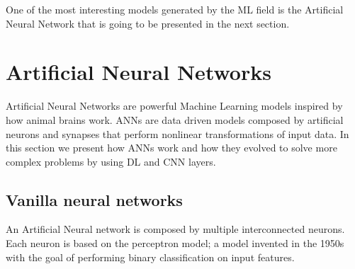 \documentclass[../main.tex]{subfiles}
\begin{document}
One of the most interesting models generated by the ML field is the Artificial Neural Network that is going to be presented in the next section.

\section{Artificial Neural Networks}
\label{ANN}

Artificial Neural Networks are powerful Machine Learning models inspired by how animal brains work.
ANNs are data driven models composed by artificial neurons and synapses that perform nonlinear transformations of input data.
In this section we present how ANNs work and how they evolved to solve more complex problems by using DL and CNN layers.

\subsection{Vanilla neural networks}
An Artificial Neural network is composed by multiple interconnected neurons. Each neuron is based on the perceptron model; a model invented in the 1950s with the goal of performing binary classification on input features.
\end{document}
